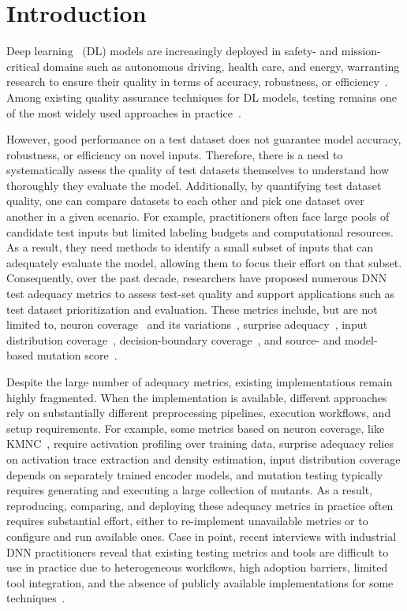 \section{Introduction}\label{sec:intro}
Deep learning~\cite{bib:lecun2015deep} (DL) models are increasingly deployed in safety- and mission-critical domains such as autonomous driving, health care, and energy, warranting research to ensure their quality in terms of accuracy, robustness, or efficiency~\cite{bib:sarker2021deep}.
Among existing quality assurance techniques for DL models, testing remains one of the most widely used approaches in practice~\cite{bib:zhang2022machine,bib:hu2024test}.

However, good performance on a test dataset does not guarantee model accuracy, robustness, or efficiency on novel inputs. Therefore, there is a need to systematically assess the quality of test datasets themselves to understand how thoroughly they evaluate the model.
Additionally, by quantifying test dataset quality, one can compare datasets to each other and pick one dataset over another in a given scenario.
For example, practitioners often face large pools of candidate test inputs but limited labeling budgets and computational resources. As a result, they need methods to identify a small subset of inputs that can adequately evaluate the model, allowing them to focus their effort on that subset.
Consequently, over the past decade, researchers have proposed numerous DNN test adequacy metrics to assess test-set quality and support applications such as test dataset prioritization and evaluation.
These metrics include, but are not limited to, neuron coverage~\cite{bib:pei2017deepxplore} and its variations~\cite{bib:ma2018deepgauge}, surprise adequacy~\cite{bib:kim2018guiding}, input distribution coverage~\cite{bib:dola2023input}, decision-boundary coverage~\cite{bib:liu2022deepboundary}, and source- and model-based mutation score~\cite{bib:hu2019deepmutation++,bib:humbatova2021deepcrime}.

Despite the large number of adequacy metrics, existing implementations remain highly fragmented. When the implementation is available, different approaches rely on substantially different preprocessing pipelines, execution workflows, and setup requirements.
For example, some metrics based on neuron coverage, like KMNC~\cite{bib:ma2018deepgauge}, require activation profiling over training data, surprise adequacy relies on activation trace extraction and density estimation, input distribution coverage depends on separately trained encoder models, and mutation testing typically requires generating and executing a large collection of mutants.
As a result, reproducing, comparing, and deploying these adequacy metrics in practice often requires substantial effort, either to re-implement unavailable metrics or to configure and run available ones.
Case in point, recent interviews with industrial DNN practitioners reveal that existing testing metrics and tools are difficult to use in practice due to heterogeneous workflows, high adoption barriers, limited tool integration, and the absence of publicly available implementations for some techniques~\cite{bib:you2025navigating}.

